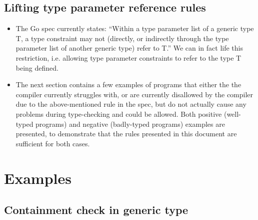 \documentclass[12pt]{article}
\begin{document}

\subsection{Lifting type parameter reference rules}

\begin{itemize}
    \item The Go spec currently states: ``Within a type parameter list of a
          generic type T, a type constraint may not (directly, or indirectly
          through the type parameter list of another generic type) refer to T.''
          We can in fact life this restriction, i.e. allowing type parameter
          constraints to refer to the type T being defined.
    \item The next section contains a few examples of programs that either the
          the compiler currently struggles with, or are currently disallowed by
          the compiler due to the above-mentioned rule in the spec, but do not
          actually cause any problems during type-checking and could be allowed.
          Both positive (well-typed programs) and negative (badly-typed
          programs) examples are presented, to demonstrate that the rules
          presented in this document are sufficient for both cases.
\end{itemize}

\section{Examples}

\subsection{Containment check in generic type}
\end{document}
